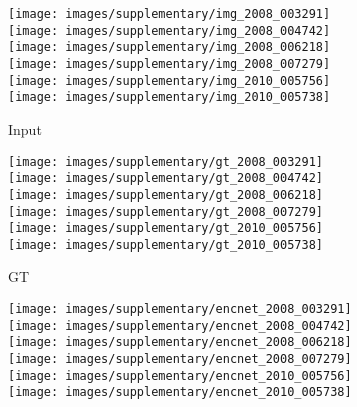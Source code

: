 \documentclass[10pt,twocolumn,letterpaper]{article}
\begin{document}
\begin{figure*}[!htb] 
\begin{center}
	\begin{subfigure}[b]{0.24\linewidth}
		\texttt{[image: images/supplementary/img\_2008\_003291]}\\
		\texttt{[image: images/supplementary/img\_2008\_004742]}\\
		\texttt{[image: images/supplementary/img\_2008\_006218]}\\
		\texttt{[image: images/supplementary/img\_2008\_007279]}\\
		\texttt{[image: images/supplementary/img\_2010\_005756]}\\
		\texttt{[image: images/supplementary/img\_2010\_005738]}\\
      	\caption{Input}
    \end{subfigure}
    \hfill
	\begin{subfigure}[b]{0.24\linewidth}
		\texttt{[image: images/supplementary/gt\_2008\_003291]}\\
		\texttt{[image: images/supplementary/gt\_2008\_004742]}\\
		\texttt{[image: images/supplementary/gt\_2008\_006218]}\\
		\texttt{[image: images/supplementary/gt\_2008\_007279]}\\
		\texttt{[image: images/supplementary/gt\_2010\_005756]}\\
		\texttt{[image: images/supplementary/gt\_2010\_005738]}\\
      	\caption{GT}
    \end{subfigure}
    \hfill
	\begin{subfigure}[b]{0.24\linewidth}
		\texttt{[image: images/supplementary/encnet\_2008\_003291]}\\
		\texttt{[image: images/supplementary/encnet\_2008\_004742]}\\
		\texttt{[image: images/supplementary/encnet\_2008\_006218]}\\
		\texttt{[image: images/supplementary/encnet\_2008\_007279]}\\
		\texttt{[image: images/supplementary/encnet\_2010\_005756]}\\
		\texttt{[image: images/supplementary/encnet\_2010\_005738]}\\

\end{subfigure}
\end{center}
\end{figure*}
\end{document}
